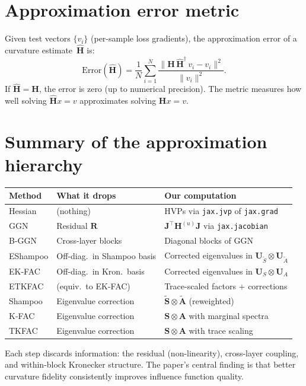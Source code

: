 \documentclass[11pt]{article}
\newcommand{\kron}{\otimes}
\begin{document}
\section{Approximation error metric}

Given test vectors $\{v_i\}$ (per-sample loss gradients), the
approximation error of a curvature estimate~$\hat{\mathbf{H}}$ is:
\[
  \text{Error}(\hat{\mathbf{H}})
  = \frac{1}{N}\sum_{i=1}^{N}
    \frac{\|\mathbf{H}\,\hat{\mathbf{H}}^{\dagger}\,v_i - v_i\|^2}
         {\|v_i\|^2}.
\]
If $\hat{\mathbf{H}} = \mathbf{H}$, the error is zero (up to
numerical precision).  The metric measures how well solving
$\hat{\mathbf{H}}x = v$ approximates solving $\mathbf{H}x = v$.

\section{Summary of the approximation hierarchy}

\begin{center}
\begin{tabular}{lll}
  \toprule
  \textbf{Method} & \textbf{What it drops} & \textbf{Our computation} \\
  \midrule
  Hessian   & (nothing)               & HVPs via \texttt{jax.jvp} of \texttt{jax.grad} \\
  GGN       & Residual $\mathbf{R}$   & $\mathbf{J}^\top\mathbf{H}^{(u)}\mathbf{J}$ via \texttt{jax.jacobian} \\
  B-GGN     & Cross-layer blocks      & Diagonal blocks of GGN \\
  EShampoo  & Off-diag.\ in Shampoo basis & Corrected eigenvalues in $\mathbf{U}_{\tilde S}\kron\mathbf{U}_{\tilde A}$ \\
  EK-FAC    & Off-diag.\ in Kron.\ basis & Corrected eigenvalues in $\mathbf{U}_S\kron\mathbf{U}_A$ \\
  ETKFAC    & (equiv.\ to EK-FAC)     & Trace-scaled factors $+$ corrections \\
  Shampoo   & Eigenvalue correction   & $\tilde{\mathbf{S}}\kron\tilde{\mathbf{A}}$ (reweighted) \\
  K-FAC     & Eigenvalue correction   & $\mathbf{S}\kron\mathbf{A}$ with marginal spectra \\
  TKFAC     & Eigenvalue correction   & $\mathbf{S}\kron\mathbf{A}$ with trace scaling \\
  \bottomrule
\end{tabular}
\end{center}

Each step discards information: the residual (non-linearity), cross-layer
coupling, and within-block Kronecker structure.  The paper's central
finding is that better curvature fidelity consistently improves influence
function quality.
\end{document}
